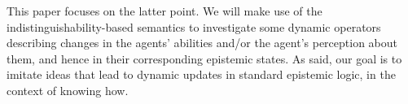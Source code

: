 %
%
%
This paper focuses on the latter point. We will make use of the in\-dis\-tin\-guisha\-bil\-i\-ty-based semantics to investigate some dynamic operators describing changes in the agents' abilities and/or the agent's perception about them, and hence in their corresponding epistemic states. As said, our goal is to imitate ideas that lead to dynamic updates in standard epistemic logic, in the context of knowing how.

